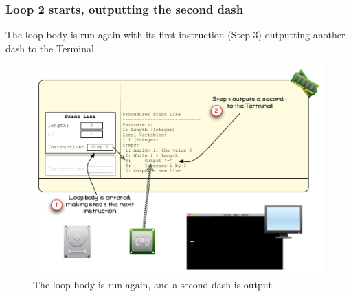 
\clearpage

\subsubsection{Loop 2 starts, outputting the second dash} %
\label{ssub:loop_2_starts_outputting_the_second_dash}

The loop body is run again with its first instruction (Step 3) outputting another dash to the Terminal.

\begin{figure}[htbp]
   \centering
   \includegraphics[width=\textwidth]{./topics/control-flow/images/PrintLine6} 
   \caption{The loop body is run again, and a second dash is output}
   \label{fig:print-line-6}
\end{figure}


